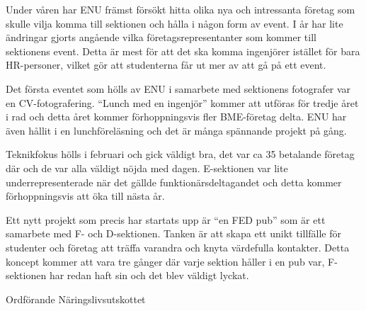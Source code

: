\documentclass[../_main/handlingar.tex]{subfiles}
\begin{document}
Under våren har ENU främst försökt hitta olika nya och intressanta företag som skulle vilja komma till sektionen och hålla i någon form av event. I år har lite ändringar gjorts angående vilka företagsrepresentanter som kommer till sektionens event. Detta är mest för att det ska komma ingenjörer istället för bara HR-personer, vilket gör att studenterna får ut mer av att gå på ett event.

Det första eventet som hölls av ENU i samarbete med sektionens fotografer var en CV-fotografering. “Lunch med en ingenjör” kommer att utföras för tredje året i rad och detta året kommer förhoppningsvis fler BME-företag delta. ENU har även hållit i en lunchföreläsning och det är många spännande projekt på gång.

Teknikfokus hölls i februari och gick väldigt bra, det var ca 35 betalande företag där och de var alla väldigt nöjda med dagen. E-sektionen var lite underrepresenterade när det gällde funktionärsdeltagandet och detta kommer förhoppningsvis att öka till nästa år.

Ett nytt projekt som precis har startats upp är “en FED pub” som är ett samarbete med F- och D-sektionen. Tanken är att skapa ett unikt tillfälle för studenter och företag att träffa varandra och knyta värdefulla kontakter. Detta koncept kommer att vara tre gånger där varje sektion håller i en pub var, F-sektionen har redan haft sin och det blev väldigt lyckat.
\begin{signatures}{1}
    \mvh
    \signature{Isabella Hansen}{Ordförande Näringslivsutskottet}
\end{signatures}
\end{document}
